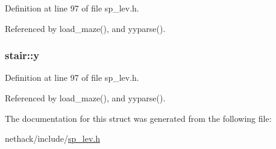 Definition at line 97 of file sp\+\_\+lev.\+h.



Referenced by load\+\_\+maze(), and yyparse().

\hypertarget{structstair_adb9f18b03852a2f5603811f0c3709d5a}{
\subsubsection[{y}]{ stair\+::y}}\label{structstair_adb9f18b03852a2f5603811f0c3709d5a}


Definition at line 97 of file sp\+\_\+lev.\+h.



Referenced by load\+\_\+maze(), and yyparse().



The documentation for this struct was generated from the following file\+:\begin{DoxyCompactItemize}
\item 
nethack/include/\hyperlink{sp__lev_8h}{sp\+\_\+lev.\+h}\end{DoxyCompactItemize}
